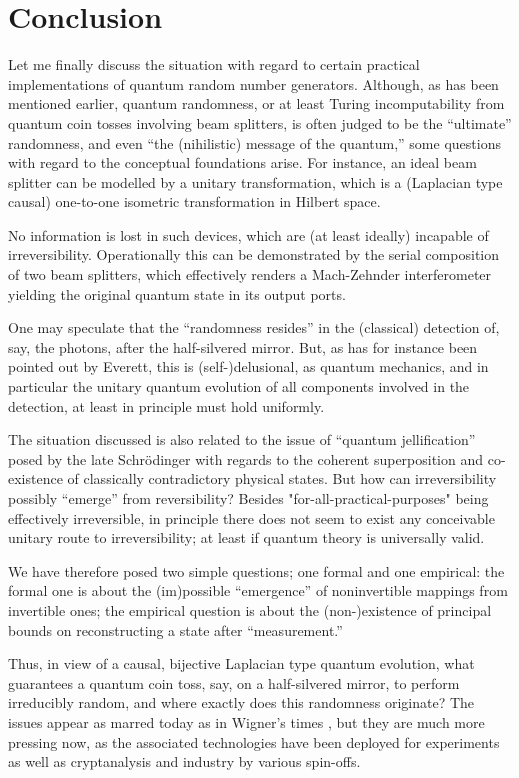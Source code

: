 \documentclass[%
 preprint,
 showpacs,
 showkeys,
 preprintnumbers,
 amsmath,amssymb,
 aps,
  pra,
  longbibliography,
 ]{revtex4-1}
\begin{document}
\section{Conclusion}

Let me finally discuss the situation with regard to certain practical implementations of quantum random number generators.
Although, as has been mentioned earlier,
quantum randomness, or at least Turing incomputability from quantum coin tosses involving beam splitters,
is often judged to be the ``ultimate'' randomness,
and even ``the (nihilistic) message of the quantum,''
some questions with regard to the conceptual foundations arise.
For instance, an ideal beam splitter can be modelled by a unitary transformation,
which is a (Laplacian type causal) one-to-one isometric transformation in Hilbert space.

No information is lost in such devices, which are (at least ideally) incapable of irreversibility.
Operationally this can be demonstrated by the serial composition of two beam splitters,
which effectively renders a Mach-Zehnder interferometer yielding the original quantum state in its output ports.

One may speculate that the ``randomness resides'' in the (classical) detection of,
say, the photons, after the half-silvered mirror.
But, as has for instance been pointed out by Everett, this is (self-)delusional,
as quantum mechanics,
and in particular the unitary quantum evolution of all components involved in the detection,
at least in principle must hold uniformly.

The  situation discussed is also related to the issue of  ``quantum jellification''
posed by the late Schr\"odinger with regards to the coherent superposition
and co-existence of classically contradictory physical states.
But how can irreversibility possibly ``emerge'' from reversibility?
Besides "for-all-practical-purposes" being effectively irreversible,
in principle there does not seem to exist any conceivable unitary route to irreversibility;
at least if quantum theory is universally valid.

We have therefore posed two simple questions; one formal and one empirical:
the formal one is about the (im)possible ``emergence'' of noninvertible mappings from invertible ones;
the empirical question is about the (non-)existence of principal bounds on reconstructing a state after ``measurement.''

Thus, in view of a causal, bijective Laplacian type quantum evolution, what guarantees a quantum coin toss, say,
on a half-silvered mirror, to perform irreducibly random,
and where exactly does this randomness originate?
The issues appear as marred today as in Wigner's times \cite{wigner:mb},
but they are much more pressing now, as the associated technologies \cite{zeilinger:qct,stefanov-2000}
have been deployed
for experiments \cite{wjswz-98}
as well as cryptanalysis and industry by various spin-offs.
\end{document}

